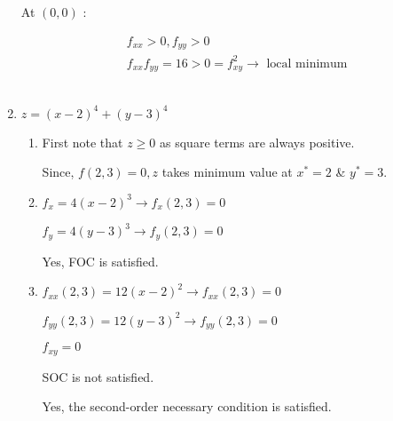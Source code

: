 \documentclass{./../../Latex/homework}
\begin{document}
\begin{enumerate}
At $(0,0)$ :

$$
\begin{aligned}
&f_{x x}>0, f_{y y}>0 \\
&f_{x x} f_{y y}=16>0=f_{x y}^{2} \rightarrow \text { local minimum }
\end{aligned}
$$ \\

\item  $z=(x-2)^{4}+(y-3)^{4}$ \\
\begin{enumerate}

\item First note that $z \geqslant 0$ as square terms are always positive.

Since, $f(2,3)=0, z$ takes minimum value at $x^{*}=2$ \& $y^{*}=3$. \\

\item $f_{x}=4(x-2)^{3} \rightarrow f_{x}(2,3)=0$

$f_{y}=4(y-3)^{3} \rightarrow f_{y}(2,3)=0$

Yes, FOC is satisfied. \\

\item $f_{x x}(2,3)=12(x-2)^{2} \rightarrow f_{x x}(2,3)=0$

$f_{y y}(2,3)=12(y-3)^{2} \rightarrow f_{yy}(2,3)=0$

$f_{x y}=0$

SOC is not satisfied. 


Yes, the second-order necessary condition is satisfied.
\end{enumerate}

\end{enumerate}
\end{document}
